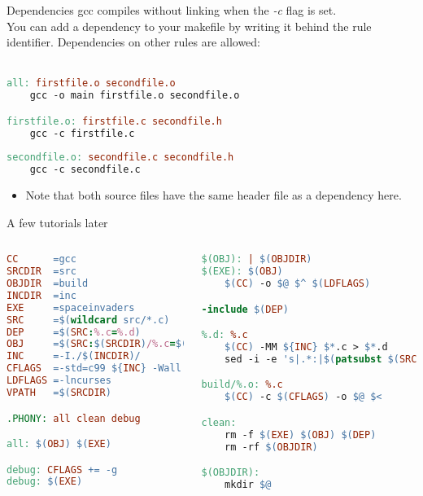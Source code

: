 
\begin{frame}[fragile]{Dependencies}
	gcc compiles without linking when the \textit{-c} flag is set.\\
	You can add a dependency to your makefile by writing it behind the rule identifier. Dependencies on other rules are allowed:\\\ \\
	\begin{lstlisting}[language=make,basicstyle=\scriptsize,numbers=none]
all: firstfile.o secondfile.o 
	gcc -o main firstfile.o secondfile.o

firstfile.o: firstfile.c secondfile.h
	gcc -c firstfile.c
	
secondfile.o: secondfile.c secondfile.h
	gcc -c secondfile.c
    \end{lstlisting}
	\begin{itemize}
		\item Note that both source files have the same header file as a dependency here.
	\end{itemize}
\end{frame}


\begin{frame}[fragile]{A few tutorials later}
	\begin{columns}
        \begin{lstlisting}[language=make,basicstyle=\tiny,escapeinside=§]
CC		=gcc
SRCDIR 	=src
OBJDIR	=build
INCDIR	=inc
EXE		=spaceinvaders
SRC 	=$(wildcard src/*.c)
DEP		=$(SRC:%.c=%.d)
OBJ		=$(SRC:$(SRCDIR)/%.c=$(OBJDIR)/%.o)
INC		=-I./$(INCDIR)/
CFLAGS	=-std=c99 ${INC} -Wall -Wextra -Wpedantic -Werror
LDFLAGS	=-lncurses
VPATH 	=$(SRCDIR)

.PHONY: all clean debug

all: $(OBJ) $(EXE)

debug: CFLAGS += -g
debug: $(EXE)
        \end{lstlisting}
        \begin{lstlisting}[language=make,basicstyle=\tiny,escapeinside=§,firstnumber=20]
$(OBJ): | $(OBJDIR)
$(EXE): $(OBJ)
	$(CC) -o $@ $^ $(LDFLAGS)

-include $(DEP)

%.d: %.c
	$(CC) -MM ${INC} $*.c > $*.d
	sed -i -e 's|.*:|$(patsubst $(SRCDIR)/%,$(OBJDIR)/%,$*).o:|' $*.d

build/%.o: %.c
	$(CC) -c $(CFLAGS) -o $@ $<

clean:
	rm -f $(EXE) $(OBJ) $(DEP)
	rm -rf $(OBJDIR)

$(OBJDIR):
	mkdir $@
        \end{lstlisting}
	\end{columns}
\end{frame}

